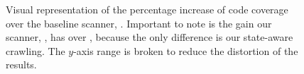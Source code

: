 \begin{figure}[tb]
  \centering
  \resizebox{\textwidth}{!}{\fontsize{10pt}{10pt}\selectfont}
  \caption[Graph of scanner code coverage results.]{Visual representation of the percentage increase of code
    coverage over the baseline scanner, \wget{}. Important to note is
    the gain our scanner, \crawler{}, has over \waf{}, because the
    only difference is our state-aware crawling. The $y$-axis range is
    broken to reduce the distortion of the \wackopicko{} results. }
\end{figure}
